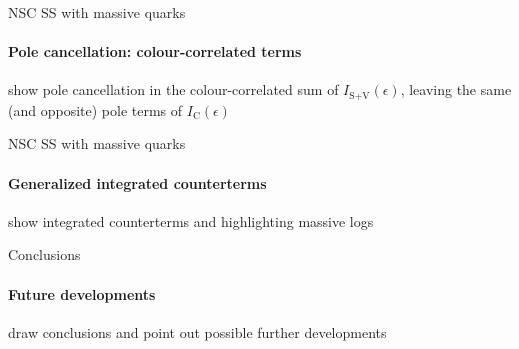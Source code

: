 
\begin{frame}{NSC SS with massive quarks}
  \framesubtitle{Pole cancellation: colour-correlated terms}

  show pole cancellation in the colour-correlated sum of $ I_{\text{S}+\text{V}}(\epsilon) $, leaving the same (and opposite) pole terms of $ I_\text{C}(\epsilon) $

\end{frame}


\begin{frame}{NSC SS with massive quarks}
  \framesubtitle{Generalized integrated counterterms}

  show integrated counterterms and highlighting massive logs

\end{frame}



\begin{frame}{Conclusions}
  \framesubtitle{Future developments}

  draw conclusions and point out possible further developments

\end{frame}










